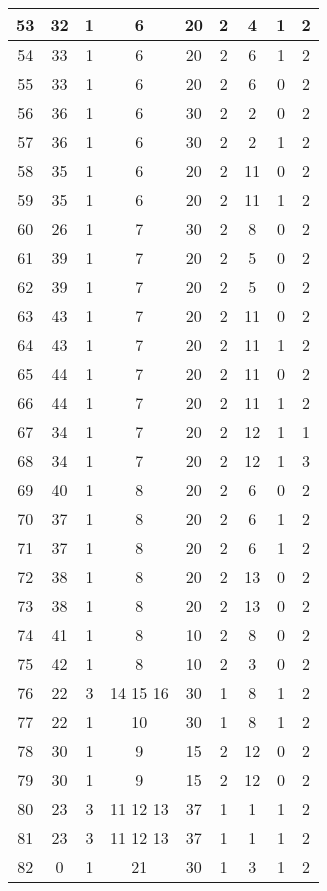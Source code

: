 \begin{apendices}
{\begin{longtable}{|c|c|c|c|c|c|c|c|c|}
53 & 32 & 1 & 6 & 20 & 2 & 4 & 1 & 2 \\ \hline
54 & 33 & 1 & 6 & 20 & 2 & 6 & 1 & 2 \\ \hline
55 & 33 & 1 & 6 & 20 & 2 & 6 & 0 & 2 \\ \hline
56 & 36 & 1 & 6 & 30 & 2 & 2 & 0 & 2 \\ \hline
57 & 36 & 1 & 6 & 30 & 2 & 2 & 1 & 2 \\ \hline
58 & 35 & 1 & 6 & 20 & 2 & 11 & 0 & 2 \\ \hline
59 & 35 & 1 & 6 & 20 & 2 & 11 & 1 & 2 \\ \hline
60 & 26 & 1 & 7 & 30 & 2 & 8 & 0 & 2 \\ \hline
61 & 39 & 1 & 7 & 20 & 2 & 5 & 0 & 2 \\ \hline
62 & 39 & 1 & 7 & 20 & 2 & 5 & 0 & 2 \\ \hline
63 & 43 & 1 & 7 & 20 & 2 & 11 & 0 & 2 \\ \hline
64 & 43 & 1 & 7 & 20 & 2 & 11 & 1 & 2 \\ \hline
65 & 44 & 1 & 7 & 20 & 2 & 11 & 0 & 2 \\ \hline
66 & 44 & 1 & 7 & 20 & 2 & 11 & 1 & 2 \\ \hline
67 & 34 & 1 & 7 & 20 & 2 & 12 & 1 & 1 \\ \hline
68 & 34 & 1 & 7 & 20 & 2 & 12 & 1 & 3 \\ \hline
69 & 40 & 1 & 8 & 20 & 2 & 6 & 0 & 2 \\ \hline
70 & 37 & 1 & 8 & 20 & 2 & 6 & 1 & 2 \\ \hline
71 & 37 & 1 & 8 & 20 & 2 & 6 & 1 & 2 \\ \hline
72 & 38 & 1 & 8 & 20 & 2 & 13 & 0 & 2 \\ \hline
73 & 38 & 1 & 8 & 20 & 2 & 13 & 0 & 2 \\ \hline
74 & 41 & 1 & 8 & 10 & 2 & 8 & 0 & 2 \\ \hline
75 & 42 & 1 & 8 & 10 & 2 & 3 & 0 & 2 \\ \hline
76 & 22 & 3 & 14 15 16 & 30 & 1 & 8 & 1 & 2 \\ \hline
77 & 22 & 1 & 10 & 30 & 1 & 8 & 1 & 2 \\ \hline
78 & 30 & 1 & 9 & 15 & 2 & 12 & 0 & 2 \\ \hline
79 & 30 & 1 & 9 & 15 & 2 & 12 & 0 & 2 \\ \hline
80 & 23 & 3 & 11 12 13 & 37 & 1 & 1 & 1 & 2 \\ \hline
81 & 23 & 3 & 11 12 13 & 37 & 1 & 1 & 1 & 2 \\ \hline
82 & 0 & 1 & 21 & 30 & 1 & 3 & 1 & 2 \\ \hline

\end{longtable}}
\end{apendices}
